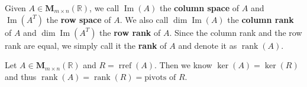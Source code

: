 \documentclass{ctexart}
\begin{document}
	\begin{mydef}
		Given $A\in \mathbf{M}_{m \times n}(\mathbb{R})$, we call $\operatorname{Im}(A)$ the \textbf{column space} of $A$ and $\operatorname{Im}(A^T)$ the \textbf{row space} of $A$. We also call $\dim \operatorname{Im}(A)$ the \textbf{column rank} of $A$ and $\dim \operatorname{Im}(A^T)$ the \textbf{row rank} of $A$. Since the column rank and the row rank are equal, we simply call it the \textbf{rank} of $A$ and denote it as $\operatorname{rank}(A)$.
	\end{mydef}
	\begin{myrmk}
		Let $A\in \mathbf{M}_{m \times n}(\mathbb{R})$ and $R=\operatorname{rref}(A)$. Then we know $\ker(A) = \ker(R)$ and thus $\operatorname{rank}(A) = \operatorname{rank}(R)=\text{pivots of } R$.
	\end{myrmk}

\end{document}
